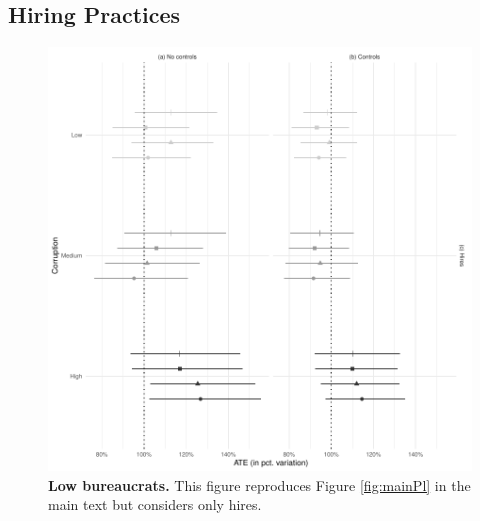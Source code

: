 {\subsection{Hiring Practices}
\label{app:hiring}
\begin{figure}[H]
    \centering
    \includegraphics{chapters/chapter_2/figures/mainPlHires.pdf}
    \caption{{\bf Low bureaucrats.} This figure reproduces Figure \ref{fig:mainPl} in the main text but considers only hires.}
    \label{fig:plHires}
\end{figure}

}
